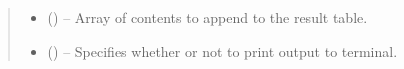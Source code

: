 \documentclass[letterpaper,10pt,english]{sphinxmanual}
\begin{document}
\begin{fulllineitems}
\begin{quote}
\begin{description}
\begin{itemize}
\item {} 
\sphinxAtStartPar
{} () – Array of contents to append to the result table.

\item {} 
\sphinxAtStartPar
{} () – Specifies whether or not to print output to terminal.

\end{itemize}

\end{description}\end{quote}

\end{fulllineitems}

\end{document}
